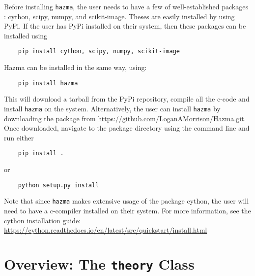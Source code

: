 \documentclass[review]{elsarticle}
\begin{document}
Before installing \texttt{hazma}, the user needs to have a few of well-established packages : cython, scipy, numpy, and scikit-image. Theses are easily installed by using PyPi. If the user has PyPi installed on their system, then these packages can be installed using
\begin{verbatim}
	pip install cython, scipy, numpy, scikit-image
\end{verbatim}
Hazma can be installed in the same way, using:
\begin{verbatim}
	pip install hazma
\end{verbatim}
This will download a tarball from the PyPi repository, compile all the c-code and install \texttt{hazma} on the system. Alternatively, the user can install \texttt{hazma} by downloading the package from \url{https://github.com/LoganAMorrison/Hazma.git}. Once downloaded, navigate to the package directory using the command line and run either
\begin{verbatim}
	pip install .
\end{verbatim}
or
\begin{verbatim}
	python setup.py install
\end{verbatim}


Note that since \texttt{hazma} makes extensive usage of the package cython, the user will need to have a c-compiler installed on their system. For more information, see the cython installation guide: \url{https://cython.readthedocs.io/en/latest/src/quickstart/install.html}




\section{Overview: The \texttt{theory} Class}%
\label{sec:overview_the_theory_class}


\end{document}
